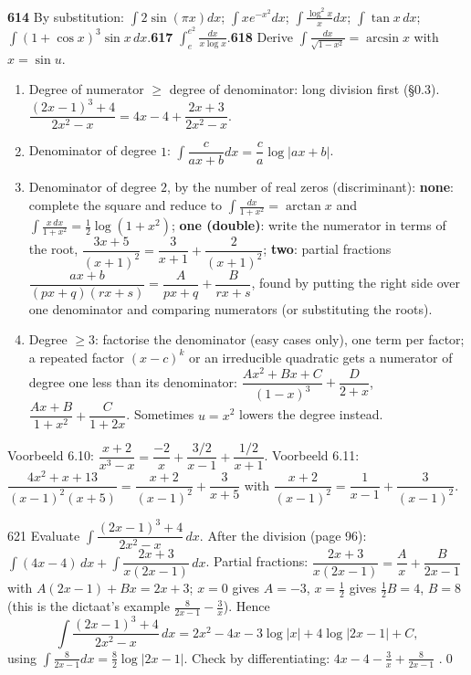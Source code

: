 \begin{trybox}[{614, 617, 618}]
\textbf{614} By substitution: $\int2\sin(\pi x)dx$; $\int xe^{-x^2}dx$; $\int\frac{\log^2x}x dx$; $\int\tan x\,dx$; $\int(1+\cos x)^3\sin x\,dx$.\quad \textbf{617} $\int_e^{e^2}\frac{dx}{x\log x}$.\quad \textbf{618} Derive $\int\frac{dx}{\sqrt{1-x^2}}=\arcsin x$ with $x=\sin u$.
\end{trybox}

\begin{strategy}
\begin{enumerate}[leftmargin=1.5em,itemsep=1pt]
\item Degree of numerator $\ge$ degree of denominator: long division first (\S0.3). $\dfrac{(2x-1)^3+4}{2x^2-x}=4x-4+\dfrac{2x+3}{2x^2-x}$.
\item Denominator of degree $1$: $\int\dfrac c{ax+b}dx=\dfrac ca\log|ax+b|$.
\item Denominator of degree $2$, by the number of real zeros (discriminant): \textbf{none}: complete the square and reduce to $\int\frac{dx}{1+x^2}=\arctan x$ and $\int\frac{x\,dx}{1+x^2}=\frac12\log(1+x^2)$; \textbf{one (double)}: write the numerator in terms of the root, $\dfrac{3x+5}{(x+1)^2}=\dfrac3{x+1}+\dfrac2{(x+1)^2}$; \textbf{two}: partial fractions $\dfrac{ax+b}{(px+q)(rx+s)}=\dfrac A{px+q}+\dfrac B{rx+s}$, found by putting the right side over one denominator and comparing numerators (or substituting the roots).
\item Degree $\ge3$: factorise the denominator (easy cases only), one term per factor; a repeated factor $(x-c)^k$ or an irreducible quadratic gets a numerator of degree one less than its denominator: $\dfrac{Ax^2+Bx+C}{(1-x)^3}+\dfrac D{2+x}$, $\dfrac{Ax+B}{1+x^2}+\dfrac C{1+2x}$. Sometimes $u=x^2$ lowers the degree instead.
\end{enumerate}
Voorbeeld 6.10: $\dfrac{x+2}{x^3-x}=\dfrac{-2}x+\dfrac{3/2}{x-1}+\dfrac{1/2}{x+1}$. Voorbeeld 6.11: $\dfrac{4x^2+x+13}{(x-1)^2(x+5)}=\dfrac{x+2}{(x-1)^2}+\dfrac3{x+5}$ with $\dfrac{x+2}{(x-1)^2}=\dfrac1{x-1}+\dfrac3{(x-1)^2}$.
\end{strategy}

\begin{bookex}{621}
Evaluate $\int\dfrac{(2x-1)^3+4}{2x^2-x}\,dx$.
\solution
After the division (page 96): $\int(4x-4)\,dx+\int\dfrac{2x+3}{x(2x-1)}\,dx$. Partial fractions: $\dfrac{2x+3}{x(2x-1)}=\dfrac Ax+\dfrac B{2x-1}$ with $A(2x-1)+Bx=2x+3$; $x=0$ gives $A=-3$, $x=\frac12$ gives $\frac12B=4$, $B=8$ (this is the dictaat's example $\frac8{2x-1}-\frac3x$). Hence
\[
\int\frac{(2x-1)^3+4}{2x^2-x}\,dx=2x^2-4x-3\log|x|+4\log|2x-1|+C,
\]
using $\int\frac8{2x-1}dx=\frac82\log|2x-1|$. Check by differentiating: $4x-4-\frac3x+\frac8{2x-1}$ \checkmark.\qed
\end{bookex}

